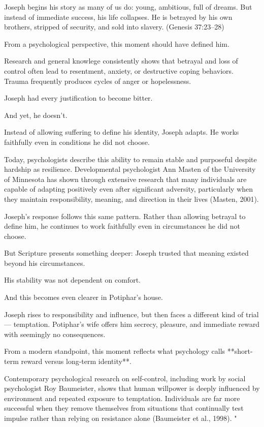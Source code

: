 \documentclass[12pt]{article}
\begin{document}
Joseph begins his story as many of us do: young, ambitious, full of dreams. But instead of immediate success, his life collapses. He is betrayed by his own brothers, stripped of security, and sold into slavery. (Genesis 37:23–28)

From a psychological perspective, this moment should have defined him.

Research and general knowlege consistently shows that betrayal and loss of control often lead to resentment, anxiety, or destructive coping behaviors. Trauma frequently produces cycles of anger or hopelessness.

Joseph had every justification to become bitter.

And yet, he doesn’t.

Instead of allowing suffering to define his identity, Joseph adapts. He works faithfully even in conditions he did not choose.

Today, psychologists describe this ability to remain stable and purposeful despite hardship as resilience. Developmental psychologist Ann Masten of the University of Minnesota has shown through extensive research that many individuals are capable of adapting positively even after significant adversity, particularly when they maintain responsibility, meaning, and direction in their lives (Masten, 2001).

Joseph’s response follows this same pattern. Rather than allowing betrayal to define him, he continues to work faithfully even in circumstances he did not choose.

But Scripture presents something deeper: Joseph trusted that meaning existed beyond his circumstances.

His stability was not dependent on comfort.

And this becomes even clearer in Potiphar’s house.

Joseph rises to responsibility and influence, but then faces a different kind of trial — temptation. Potiphar’s wife offers him secrecy, pleasure, and immediate reward with seemingly no consequences.

From a modern standpoint, this moment reflects what psychology calls **short-term reward versus long-term identity**.

Contemporary psychological research on self-control, including work by social psychologist Roy Baumeister, shows that human willpower is deeply influenced by environment and repeated exposure to temptation. Individuals are far more successful when they remove themselves from situations that continually test impulse rather than relying on resistance alone (Baumeister et al., 1998).
"
\end{document}

